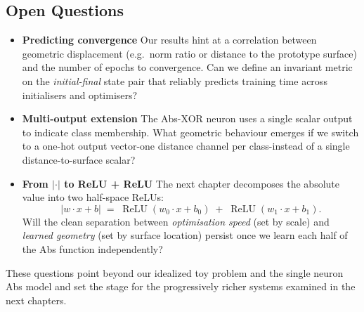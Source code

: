 \subsection*{Open Questions}

\begin{itemize}
    \item \textbf{Predicting convergence}  
          Our results hint at a correlation between geometric displacement
          (e.g.\ norm ratio or distance to the prototype surface) and the
          number of epochs to convergence.  Can we define an invariant metric
          on the \emph{initial-final} state pair that reliably predicts
          training time across initialisers and optimisers?

    \item \textbf{Multi-output extension}  
          The Abs-XOR neuron uses a single scalar output to indicate class
          membership.  What geometric behaviour emerges if we switch to a
          one-hot output vector-one distance channel per class-instead of a
          single distance-to-surface scalar?

    \item \textbf{From $\lvert\cdot\rvert$ to ReLU + ReLU}  
          The next chapter decomposes the absolute value into two half-space
          ReLUs:  
          \[
              \lvert w\!\cdot\!x + b\rvert
              \;=\;
              \operatorname{ReLU}(w_0\!\cdot\!x + b_0)
              \;+\;
              \operatorname{ReLU}(w_1\!\cdot\!x + b_1).
          \]
          Will the clean separation between \emph{optimisation speed} (set by
          scale) and \emph{learned geometry} (set by surface location) persist
          once we learn each half of the Abs function independently?
\end{itemize}

These questions point beyond our idealized toy problem and the single 
neuron Abs model and set the stage for the progressively richer systems 
examined in the next chapters.
